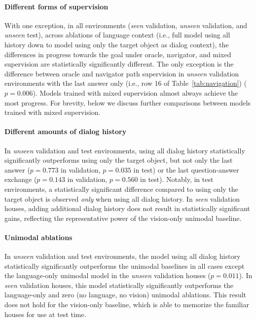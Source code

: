 \paragraph{Different forms of supervision}
With one exception, in all environments (\emph{seen} validation, \emph{unseen} validation, and \emph{unseen} test), across ablations of language context (i.e., full model using all history down to model using only the target object as dialog context), the differences in progress towards the goal under oracle, navigator, and mixed supervision are statistically significantly different.
The only exception is the difference between oracle and navigator path supervision in \emph{unseen} validation environments with the last answer only (i.e., row 16 of Table~\ref{tab:navigation}) ($p=0.006$).
Models trained with mixed supervision almost always achieve the most progress. For brevity, below we discuss further comparisons between models trained with mixed supervision.

\paragraph{Different amounts of dialog history}
In \emph{unseen} validation and test environments, using all dialog history statistically significantly outperforms using only the target object, but not only the last answer ($p=0.773$ in validation, $p=0.035$ in test) or the last question-answer exchange ($p=0.143$ in validation, $p=0.560$ in test).
Notably, in test environments, a statistically significant difference compared to using only the target object is observed \emph{only} when using all dialog history.
In \emph{seen} validation houses, adding additional dialog history does not result in statistically significant gains, reflecting the representative power of the vision-only unimodal baseline.

\paragraph{Unimodal ablations}
In \emph{unseen} validation and test environments, the model using all dialog history statistically significantly outperforms the unimodal baselines in all cases except the language-only unimodal model in the \emph{unseen} validation houses ($p=0.011$).
In \emph{seen} validation houses, this model statistically significantly outperforms the language-only and zero (no language, no vision) unimodal ablations.
This result does not hold for the vision-only baseline, which is able to memorize the familiar houses for use at test time.


